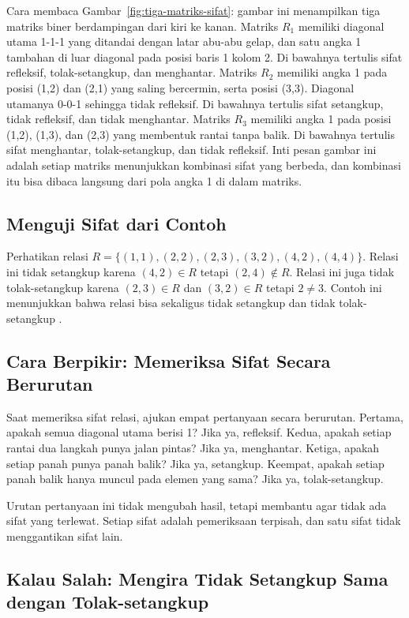 \documentclass[11pt,a4paper]{article}
\begin{document}
Cara membaca Gambar~\ref{fig:tiga-matriks-sifat}: gambar ini menampilkan tiga matriks biner berdampingan dari kiri ke kanan. Matriks $R_1$ memiliki diagonal utama 1-1-1 yang ditandai dengan latar abu-abu gelap, dan satu angka 1 tambahan di luar diagonal pada posisi baris 1 kolom 2. Di bawahnya tertulis sifat refleksif, tolak-setangkup, dan menghantar. Matriks $R_2$ memiliki angka 1 pada posisi (1,2) dan (2,1) yang saling bercermin, serta posisi (3,3). Diagonal utamanya 0-0-1 sehingga tidak refleksif. Di bawahnya tertulis sifat setangkup, tidak refleksif, dan tidak menghantar. Matriks $R_3$ memiliki angka 1 pada posisi (1,2), (1,3), dan (2,3) yang membentuk rantai tanpa balik. Di bawahnya tertulis sifat menghantar, tolak-setangkup, dan tidak refleksif. Inti pesan gambar ini adalah setiap matriks menunjukkan kombinasi sifat yang berbeda, dan kombinasi itu bisa dibaca langsung dari pola angka 1 di dalam matriks.

\subsection{Menguji Sifat dari Contoh}

Perhatikan relasi $R=\{(1,1),(2,2),(2,3),(3,2),(4,2),(4,4)\}$. Relasi ini tidak setangkup karena $(4,2) \in R$ tetapi $(2,4) \notin R$. Relasi ini juga tidak tolak-setangkup karena $(2,3) \in R$ dan $(3,2) \in R$ tetapi $2 \ne 3$. Contoh ini menunjukkan bahwa relasi bisa sekaligus tidak setangkup dan tidak tolak-setangkup \cite{rosen}.

\subsection{Cara Berpikir: Memeriksa Sifat Secara Berurutan}

Saat memeriksa sifat relasi, ajukan empat pertanyaan secara berurutan. Pertama, apakah semua diagonal utama berisi 1? Jika ya, refleksif. Kedua, apakah setiap rantai dua langkah punya jalan pintas? Jika ya, menghantar. Ketiga, apakah setiap panah punya panah balik? Jika ya, setangkup. Keempat, apakah setiap panah balik hanya muncul pada elemen yang sama? Jika ya, tolak-setangkup.

Urutan pertanyaan ini tidak mengubah hasil, tetapi membantu agar tidak ada sifat yang terlewat. Setiap sifat adalah pemeriksaan terpisah, dan satu sifat tidak menggantikan sifat lain.

\subsection{Kalau Salah: Mengira Tidak Setangkup Sama dengan Tolak-setangkup}
\end{document}
